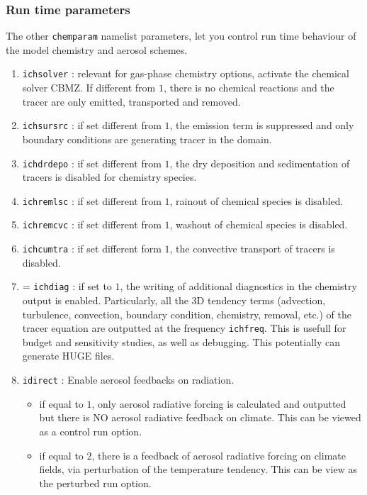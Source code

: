 \subsubsection{Run time parameters}
The other \verb=chemparam= namelist parameters, let you control run time behaviour
of the model chemistry and aerosol schemes.

\begin{enumerate}
  \item \verb=ichsolver= : relevant for gas-phase chemistry options, activate
    the chemical solver CBMZ. If different from $1$, there is no chemical
    reactions and the tracer are only emitted, transported and removed.
  \item \verb=ichsursrc= : if set different from $1$, the emission term is
    suppressed and only boundary conditions are generating tracer in the domain.
  \item \verb=ichdrdepo= : if set different from $1$, the dry deposition and
    sedimentation of tracers is disabled for chemistry species.
  \item \verb=ichremlsc= : if set different from $1$,  rainout of chemical
    species is disabled.
  \item \verb=ichremcvc= : if set different from $1$,  washout of chemical
    species is disabled.
  \item \verb=ichcumtra= : if set different form $1$, the convective transport
    of tracers is disabled.
  \item= \verb=ichdiag= : if set to $1$, the writing of additional diagnostics
    in the chemistry output is enabled. Particularly, all the 3D tendency terms
    (advection, turbulence, convection, boundary condition, chemistry, removal,
    etc.) of the tracer equation are outputted at the frequency \verb=ichfreq=.
    This is usefull for budget and sensitivity studies, as well as debugging.
    This potentially can generate HUGE files.
  \item \verb=idirect= : Enable aerosol feedbacks on radiation.
    \begin{itemize}
      \item if equal to $1$, only aerosol radiative forcing is calculated and
        outputted but there is NO aerosol radiative feedback on climate.
        This can be viewed as a control run option.
      \item if equal to $2$, there is a feedback of aerosol radiative forcing
        on climate fields, via perturbation of the temperature tendency.
        This can be view as the perturbed run option.

\end{itemize}
\end{enumerate}
